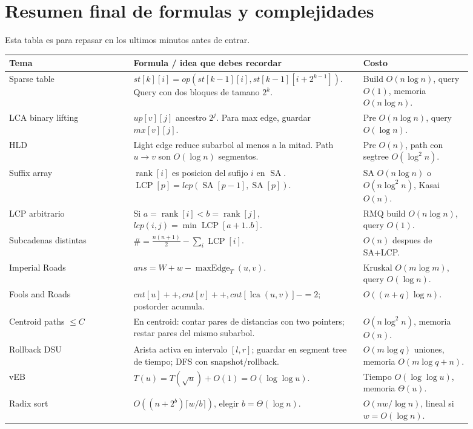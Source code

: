 \documentclass[10pt]{article}
\newcommand{\bigO}{O}
\newcommand{\SA}{\operatorname{SA}}
\newcommand{\LCP}{\operatorname{LCP}}
\newcommand{\rankv}{\operatorname{rank}}
\newcommand{\lca}{\operatorname{lca}}
\begin{document}
\section{Resumen final de formulas y complejidades}
Esta tabla es para repasar en los ultimos minutos antes de entrar.

\begin{center}
\begin{tabular}{p{0.25\linewidth}p{0.42\linewidth}p{0.22\linewidth}}
\toprule
Tema & Formula / idea que debes recordar & Costo \\
\midrule
Sparse table &
\(st[k][i]=op(st[k-1][i],st[k-1][i+2^{k-1}])\). Query con dos bloques de tamano \(2^k\). &
Build \(\bigO(n\log n)\), query \(\bigO(1)\), memoria \(\bigO(n\log n)\). \\
\addlinespace
LCA binary lifting &
\(up[v][j]\) ancestro \(2^j\). Para max edge, guardar \(mx[v][j]\). &
Pre \(\bigO(n\log n)\), query \(\bigO(\log n)\). \\
\addlinespace
HLD &
Light edge reduce subarbol al menos a la mitad. Path \(u\to v\) son \(\bigO(\log n)\) segmentos. &
Pre \(\bigO(n)\), path con segtree \(\bigO(\log^2 n)\). \\
\addlinespace
Suffix array &
\(\rankv[i]\) es posicion del sufijo \(i\) en \(\SA\). \(\LCP[p]=lcp(\SA[p-1],\SA[p])\). &
SA \(\bigO(n\log n)\) o \(\bigO(n\log^2 n)\), Kasai \(\bigO(n)\). \\
\addlinespace
LCP arbitrario &
Si \(a=\rankv[i]<b=\rankv[j]\), \(lcp(i,j)=\min \LCP[a+1..b]\). &
RMQ build \(\bigO(n\log n)\), query \(\bigO(1)\). \\
\addlinespace
Subcadenas distintas &
\(\#=\frac{n(n+1)}2-\sum_i \LCP[i]\). &
\(\bigO(n)\) despues de SA+LCP. \\
\addlinespace
Imperial Roads &
\(ans=W+w-\operatorname{maxEdge}_T(u,v)\). &
Kruskal \(\bigO(m\log m)\), query \(\bigO(\log n)\). \\
\addlinespace
Fools and Roads &
\(cnt[u]++,cnt[v]++,cnt[\lca(u,v)]-=2\); postorder acumula. &
\(\bigO((n+q)\log n)\). \\
\addlinespace
Centroid paths \(\le C\) &
En centroid: contar pares de distancias con two pointers; restar pares del mismo subarbol. &
\(\bigO(n\log^2 n)\), memoria \(\bigO(n)\). \\
\addlinespace
Rollback DSU &
Arista activa en intervalo \([l,r]\); guardar en segment tree de tiempo; DFS con snapshot/rollback. &
\(\bigO(m\log q)\) uniones, memoria \(\bigO(m\log q+n)\). \\
\addlinespace
vEB &
\(T(u)=T(\sqrt u)+\bigO(1)=\bigO(\log\log u)\). &
Tiempo \(\bigO(\log\log u)\), memoria \(\Theta(u)\). \\
\addlinespace
Radix sort &
\(\bigO((n+2^b)\lceil w/b\rceil)\), elegir \(b=\Theta(\log n)\). &
\(\bigO(nw/\log n)\), lineal si \(w=\bigO(\log n)\). \\
\bottomrule
\end{tabular}
\end{center}
\end{document}
